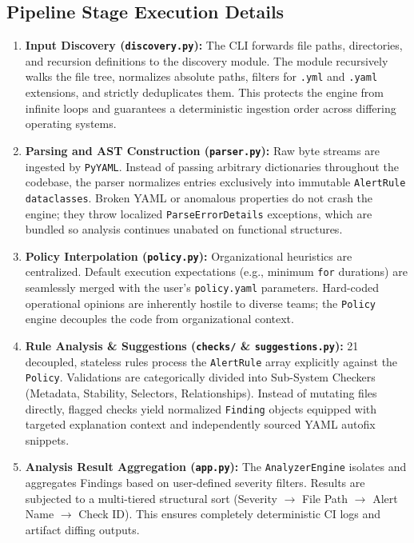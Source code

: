 \documentclass[a4paper,11pt]{article}
\begin{document}
\subsection{Pipeline Stage Execution Details}

\begin{enumerate}
    \item \textbf{Input Discovery (\texttt{discovery.py}):} The CLI forwards file paths, directories, and recursion definitions to the discovery module. The module recursively walks the file tree, normalizes absolute paths, filters for \texttt{.yml} and \texttt{.yaml} extensions, and strictly deduplicates them. This protects the engine from infinite loops and guarantees a deterministic ingestion order across differing operating systems.
    
    \item \textbf{Parsing and AST Construction (\texttt{parser.py}):} Raw byte streams are ingested by \texttt{PyYAML}. Instead of passing arbitrary dictionaries throughout the codebase, the parser normalizes entries exclusively into immutable \texttt{AlertRule} \texttt{dataclasses}. Broken YAML or anomalous properties do not crash the engine; they throw localized \texttt{ParseErrorDetails} exceptions, which are bundled so analysis continues unabated on functional structures.
    
    \item \textbf{Policy Interpolation (\texttt{policy.py}):} Organizational heuristics are centralized. Default execution expectations (e.g., minimum \texttt{for} durations) are seamlessly merged with the user's \texttt{policy.yaml} parameters. Hard-coded operational opinions are inherently hostile to diverse teams; the \texttt{Policy} engine decouples the code from organizational context.
    
    \item \textbf{Rule Analysis \& Suggestions (\texttt{checks/} & \texttt{suggestions.py}):} 21 decoupled, stateless rules process the \texttt{AlertRule} array explicitly against the \texttt{Policy}. Validations are categorically divided into Sub-System Checkers (Metadata, Stability, Selectors, Relationships). Instead of mutating files directly, flagged checks yield normalized \texttt{Finding} objects equipped with targeted explanation context and independently sourced YAML autofix snippets.
    
    \item \textbf{Analysis Result Aggregation (\texttt{app.py}):} The \texttt{AnalyzerEngine} isolates and aggregates Findings based on user-defined severity filters. Results are subjected to a multi-tiered structural sort (Severity $\rightarrow$ File Path $\rightarrow$ Alert Name $\rightarrow$ Check ID). This ensures completely deterministic CI logs and artifact diffing outputs.
    

\end{enumerate}
\end{document}
